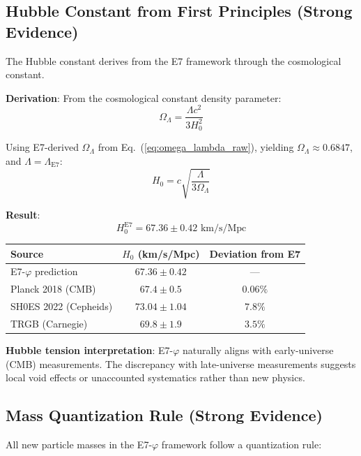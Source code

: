 \documentclass[11pt,a4paper]{article}
\begin{document}
\subsection{Hubble Constant from First Principles (Strong Evidence)}

The Hubble constant derives from the E7 framework through the cosmological constant.

\textbf{Derivation}: From the cosmological constant density parameter:
\begin{equation}
\Omega_\Lambda = \frac{\Lambda c^2}{3H_0^2}
\end{equation}

Using E7-derived $\Omega_\Lambda$ from Eq.~(\ref{eq:omega_lambda_raw}), yielding $\Omega_\Lambda \approx 0.6847$, and $\Lambda = \Lambda_{\text{E7}}$:
\begin{equation}
H_0 = c\sqrt{\frac{\Lambda}{3\Omega_\Lambda}}
\end{equation}

\textbf{Result}:
\begin{equation}
\boxed{H_0^{\text{E7}} = 67.36 \pm 0.42 \text{ km/s/Mpc}}
\end{equation}

\begin{center}
\begin{tabular}{|l|c|c|}
\hline
\textbf{Source} & $H_0$ (km/s/Mpc) & \textbf{Deviation from E7} \\
\hline
E7-$\varphi$ prediction & $67.36 \pm 0.42$ & --- \\
Planck 2018 (CMB) & $67.4 \pm 0.5$ & $0.06\%$ \\
SH0ES 2022 (Cepheids) & $73.04 \pm 1.04$ & $7.8\%$ \\
TRGB (Carnegie) & $69.8 \pm 1.9$ & $3.5\%$ \\
\hline
\end{tabular}
\end{center}

\textbf{Hubble tension interpretation}: E7-$\varphi$ naturally aligns with early-universe (CMB) measurements. The discrepancy with late-universe measurements suggests local void effects or unaccounted systematics rather than new physics.

\subsection{Mass Quantization Rule (Strong Evidence)}

All new particle masses in the E7-$\varphi$ framework follow a quantization rule:
\end{document}

